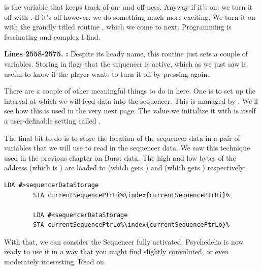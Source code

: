   is the variable that keeps track of on- and off-ness. Anyway if it's on: we turn it off
with . If it's off however: we do something much more exciting. We turn it on with the grandly titled routine
, which we come to next. Programming is fascinating and complex I find.

\textbf{Lines 2558-2575. :}  Despite its heady name, this routine just sets a couple of variables.
Storing  in  flags that the sequencer is active, which as we just saw is useful to know if the player wants
to turn it off by pressing  again. 

There are a couple of other meaningful things to do in here. One is to set up the interval at which we will feed data into the sequencer.
This is managed by . We'll see how this is used in the very next page. The value we initialize it
with is itself a user-definable setting called .

The final bit to do is to store the location of the sequencer data in a pair of variables that we will use to read in the sequencer data. We
saw this technique used in the previous chapter on Burst data. The high and low bytes of the address  (which is ) are loaded to 
 (which gets ) and  (which gets ) respectively:
\begin{lstlisting}[escapechar=\%]
        LDA #>sequencerDataStorage
        STA currentSequencePtrHi%\index{currentSequencePtrHi}%

        LDA #<sequencerDataStorage
        STA currentSequencePtrLo%\index{currentSequencePtrLo}%
\end{lstlisting}

With that, we can consider the Sequencer fully activated. Psychedelia is now ready to use it in a way that you might find slightly 
convoluted, or even moderately interesting. Read on.

\clearpage


